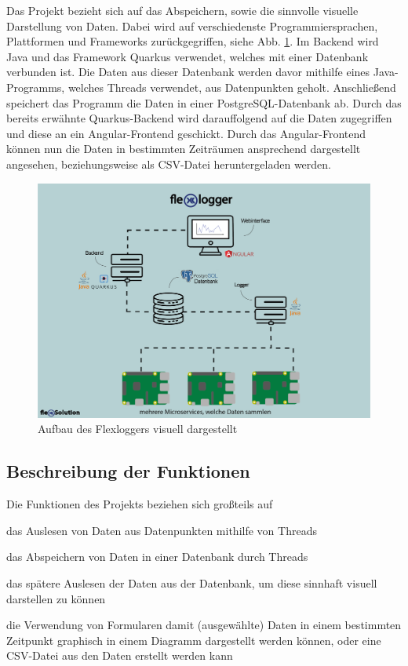 Das Projekt bezieht sich auf das Abspeichern, sowie die sinnvolle visuelle Darstellung von Daten. Dabei wird auf verschiedenste Programmiersprachen, Plattformen und Frameworks zurückgegriffen, siehe Abb. \ref{fig:impl:FlexLoggerAufbau}. 
Im Backend wird Java und das Framework Quarkus verwendet, welches mit einer Datenbank verbunden ist. Die Daten aus dieser Datenbank werden davor mithilfe eines Java-Programms, welches Threads verwendet, aus Datenpunkten geholt. Anschließend speichert das Programm die Daten in einer PostgreSQL-Datenbank ab. Durch das bereits erwähnte Quarkus-Backend wird darauffolgend auf die Daten zugegriffen und diese an ein Angular-Frontend geschickt. Durch das Angular-Frontend können nun die Daten in bestimmten Zeiträumen ansprechend dargestellt angesehen, beziehungsweise als CSV-Datei heruntergeladen werden.

\begin{figure}
    \centering
    \includegraphics[scale=0.7]{pics/webinertface2.png}
    \caption{Aufbau des Flexloggers visuell dargestellt}
    \label{fig:impl:FlexLoggerAufbau}
\end{figure}

\subsection{Beschreibung der Funktionen}
Die Funktionen des Projekts beziehen sich großteils auf 
\begin{compactitem}
    \item das Auslesen von Daten aus Datenpunkten mithilfe von Threads
    \item das Abspeichern von Daten in einer Datenbank durch Threads
    \item das spätere Auslesen der Daten aus der Datenbank, um diese sinnhaft visuell darstellen zu können
    \item die Verwendung von Formularen damit (ausgewählte) Daten in einem bestimmten Zeitpunkt graphisch in einem Diagramm dargestellt werden können, oder eine CSV-Datei aus den Daten erstellt werden kann
\end{compactitem}



